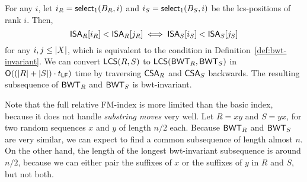 For any $i$, let $i_{R} = \mathsf{select}_{1}(B_{R}, i)$ and $i_{S} =
\mathsf{select}_{1}(B_{S}, i)$ be the lcs-positions of rank $i$. Then,
$$
\mathsf{ISA}_{R}[i_{R}] < \mathsf{ISA}_{R}[j_{R}] \iff \mathsf{ISA}_{S}[i_{S}] < \mathsf{ISA}_{S}[j_{S}]
$$
for any $i,j \le \lvert X \rvert$, which is equivalent to the condition in
Definition~\ref{def:bwt-invariant}. We can convert $\mathsf{LCS}(R,S)$ to
$\mathsf{LCS}(\mathsf{BWT}_{R},\mathsf{BWT}_{S})$ in $\mathsf{O}((\lvert R \rvert+\lvert S \rvert) \cdot t_{\mathsf{LF}})$ time by
traversing $\mathsf{CSA}_{R}$ and $\mathsf{CSA}_{S}$ backwards. The resulting subsequence of
$\mathsf{BWT}_{R}$ and $\mathsf{BWT}_{S}$ is bwt-invariant.

Note that the full relative FM-index is more limited than the basic index,
because it does not handle \emph{substring moves} very well. Let $R = xy$ and
$S = yx$, for two random sequences $x$ and $y$ of length $n/2$ each. Because
$\mathsf{BWT}_{R}$ and $\mathsf{BWT}_{S}$ are very similar, we can expect to find a common
subsequence of length almost $n$. On the other hand, the length of the longest
bwt-invariant subsequence is around $n/2$, because we can either pair the
suffixes of $x$ or the suffixes of $y$ in $R$ and $S$, but not both.


